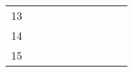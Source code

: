 \begin{table}[ht]
\begin{tabular}{c|lllllllll}
    13                                                                                                         &                                                                              &                                                          &                                                           &                                                                &                                                                  &                                                                                                                 &                                                                                                                &                                                                                                                                &                                                            \\
    14                                                                                                         &                                                                              &                                                          &                                                           &                                                                &                                                                  &                                                                                                                 &                                                                                                                &                                                                                                                                &                                                            \\
    15                                                                                                         &                                                                              &                                                          &                                                           &                                                                &                                                                  &                                                                                                                 &                                                                                                                &                                                                                                                                &                                                            \\

\end{tabular}
\end{table}
